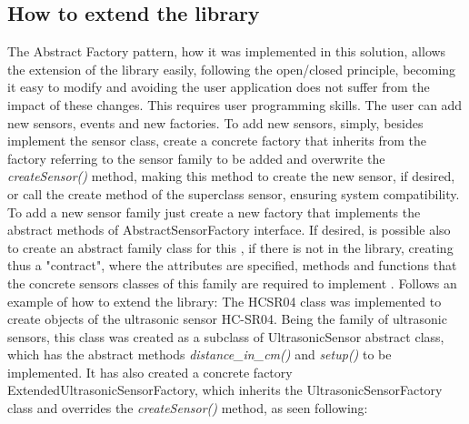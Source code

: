 \documentclass{acm_proc_article-sp}
\begin{document}
\subsection{How to extend the library}
The Abstract Factory pattern, how it was implemented in this solution, allows the extension of the library easily, following the  open/closed principle, becoming it easy to modify and avoiding the user application does not suffer from the impact of these changes. This requires user programming skills. The user can add new sensors, events and new factories. To add new sensors, simply, besides implement the sensor class, create a concrete factory that inherits from the factory referring to the sensor family to be added and overwrite the \textit{createSensor()} method, making this method to create the new sensor, if desired, or call the create method of the superclass sensor, ensuring system compatibility.
\newline
\newline
To add a new sensor family just create a new factory that implements the abstract methods of AbstractSensorFactory interface. If desired, is possible also to create an abstract family class for this , if there is not in  the library, creating thus a "contract", where the attributes are specified, methods and functions that the concrete sensors classes of this family are required to implement .
\newline
\newline
Follows an example of how to extend the library: The HCSR04 class was implemented to create objects of the ultrasonic sensor HC-SR04. Being the family of ultrasonic sensors, this class was created as a subclass of UltrasonicSensor abstract class, which has the abstract methods \textit{distance\_in\_cm()} and \textit{setup()}  to be implemented. It has also created a concrete factory ExtendedUltrasonicSensorFactory, which inherits the UltrasonicSensorFactory class and overrides the \textit{createSensor()} method, as seen following:
\end{document}
